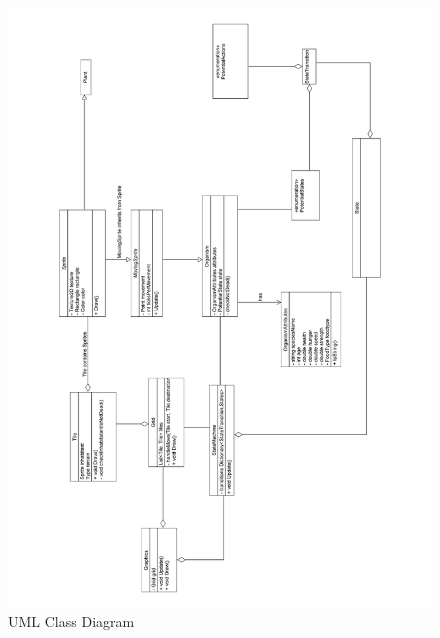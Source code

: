 \documentclass[a4paper, oneside, 11pt]{report}
\begin{document}
\begin{figure}[H]
	\caption{UML Class Diagram}\label{classdiagram}
	\includegraphics[width=\textwidth,height=\textheight]{class-diagram}
\end{figure}
\end{document}
